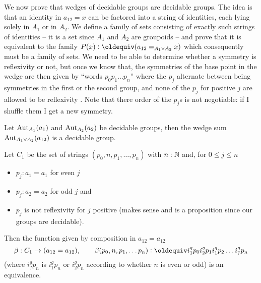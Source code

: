 We now prove that wedges of decidable groups are decidable groups.   The idea is that an identity in $a_{12}=x$ can be factored into a string of identities, each lying solely in $A_1$ or in $A_2$.  We define a family of sets consisting of exactly such strings of identities --  it is a set since $A_1$ and $A_2$ are groupoids -- and prove that it is equivalent to the family $P(x)\defequi(a_{12}=_{A_1\vee A_2}x)$ which consequently must be a family of sets.
We need to be able to determine whether a symmetry is reflexivity or not, but once we know that, the symmetries of the base point in the wedge are then given by ``words $p_0p_1\dots p_n$'' where the $p_j$ alternate between being symmetries in the first or the second group, and none of the $p_j$ for positive $j$ are allowed to be reflexivity%
.  Note that there order of the $p_j$s is not negotiable: if I shuffle them I get a new symmetry.
\begin{lemma}
  \label{lem:wedgeofgpoidisgpoid}
  Let $\mathrm{Aut}_{A_1}(a_1)$ and $\mathrm{Aut}_{A_2}(a_2)$ be decidable groups, then the wedge sum $\mathrm{Aut}_{A_1\vee A_2}(a_{12})$ is a decidable group.  

Let $C_1$ be the set of strings $(p_0,n,p_1,\dots,p_n)$ with $n:\mathbb{N}$ and, for $0\leq j\leq n$ 
\begin{itemize}
\item $p_{j}:a_1=a_1$ for even $j$ 
\item $p_{j}:a_2=a_2$ for odd $j$ and 
\item $p_j$ is not reflexivity for $j$ positive (makes sense and is a proposition since our groups are decidable).
\end{itemize}
  Then the function given by composition in $a_{12}=a_{12}$
$$\beta:C_1\to(a_{12}=a_{12}),\qquad\beta(p_0,n,p_1,\dots p_n)\defequi i_1^gp_0i_2^gp_1i_1^gp_2\dots i_?^gp_n$$ 
(where $i_?^gp_n$  is $i_1^gp_n$ or $i_2^gp_n$ according to whether $n$ is even or odd) is an equivalence.
\end{lemma}

